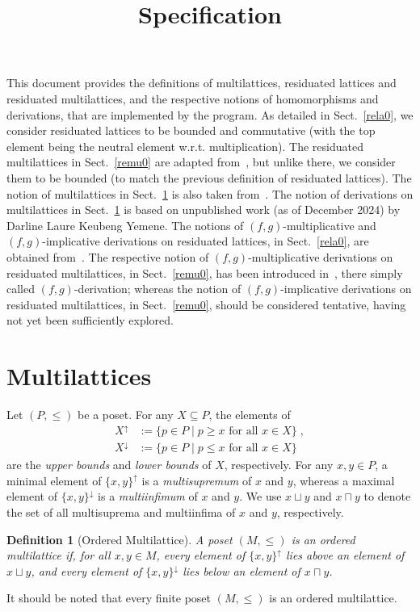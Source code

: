 \documentclass{article}
\newtheorem{definition}{Definition}
\begin{document}
\title{Specification}
\author{}
\date{}
\maketitle
This document provides the definitions of multilattices, residuated lattices and residuated multilattices, and the respective notions of homomorphisms and
derivations, that are implemented by the program. As detailed in Sect.~\ref{rela0}, we consider residuated lattices to be bounded and commutative (with the
top element being the neutral element w.r.t. multiplication). The residuated multilattices in Sect.~\ref{remu0} are adapted from~\cite{CCG14}, but unlike there,
we consider them to be bounded (to match the previous definition of residuated lattices). The notion of multilattices in Sect.~\ref{mult0} is also taken
from~\cite{CCG14}. The notion of derivations on multilattices in Sect.~\ref{mult0} is based on unpublished work (as of December 2024)
by Darline Laure Keubeng Yemene. The notions of $(f,g)$-multiplicative and $(f,g)$-implicative derivations on residuated lattices,
in Sect.~\ref{rela0}, are obtained from~\cite{YFAL20}. The respective notion of $(f,g)$-multiplicative derivations on residuated multilattices,
in Sect.~\ref{remu0}, has been introduced in~\cite{YFL22}, there simply called $(f,g)$-derivation; whereas the notion of $(f,g)$-implicative derivations
on residuated multilattices, in Sect.~\ref{remu0}, should be considered tentative, having not yet been sufficiently explored.

\section{Multilattices}
\label{mult0}
Let $(P,\leq)$ be a poset. For any $X \subseteq P$, the elements of
\begin{align}
X^{\uparrow} &:= \{p \in P \mid p \geq x \text{ for all } x \in X\} \;,\\
X^{\downarrow} &:= \{p \in P \mid p \leq x \text{ for all } x \in X\}
\end{align}
are the \emph{upper bounds} and \emph{lower bounds} of $X$, respectively. For any $x,y \in P$, a minimal element of $\{x,y\}^{\uparrow}$
is a \emph{multisupremum} of $x$ and $y$, whereas a maximal element of $\{x,y\}^{\downarrow}$ is a \emph{multiinfimum} of $x$ and $y$. We use $x \sqcup y$ and
$x \sqcap y$ to denote the set of all multisuprema and multiinfima of $x$ and $y$, respectively.

\begin{definition}[Ordered Multilattice]
A poset $(M,\leq)$ is an \emph{ordered multilattice} if, for all $x,y \in M$, every element of $\{x,y\}^{\uparrow}$ lies above an element of $x \sqcup y$,
and every element of $\{x,y\}^{\downarrow}$ lies below an element of $x \sqcap y$.
\end{definition}
It should be noted that every finite poset $(M,\leq)$ is an ordered multilattice.
\end{document}
